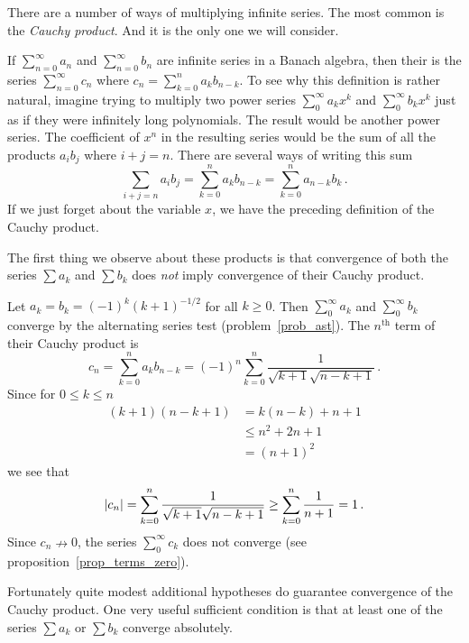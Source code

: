 There are a number of ways of multiplying infinite series.  The most common is the
\emph{Cauchy product}.  And it is the only one we will consider.

\begin{defn}  If $\sum_{n=0}^\infty a_n$ and $\sum_{n=0}^\infty b_n$ are infinite series in a
Banach algebra, then their
 is the series $\sum_{n=0}^\infty c_n$ where $c_n = \sum_{k=0}^n a_k
b_{n-k}$.  To see why this definition is rather natural, imagine trying to multiply two power
series $\sum_0^\infty a_kx^k$ and $\sum_0^\infty b_kx^k$ just as if they were infinitely long
polynomials.  The result would be another power series.  The coefficient of $x^n$ in the
resulting series would be the sum of all the products $a_ib_j$ where $i+j = n$. There are
several ways of writing this sum
  \[ \sum_{i+j = n}a_ib_j = \sum_{k=0}^n a_kb_{n-k} = \sum_{k=0}^n a_{n-k}b_k\,. \]
If we just forget about the variable $x$, we have the preceding definition of the Cauchy
product.
\end{defn}

The first thing we observe about these products is that convergence of both the series $\sum
a_k$ and $\sum b_k$ does \emph{not} imply convergence of their Cauchy product.

\begin{exam}  Let $a_k = b_k = (-1)^k(k+1)^{-1/2}$ for all $k \ge 0$.  Then $\sum_0^\infty a_k$
and $\sum_0^\infty b_k$ converge by the alternating series test (problem~\ref{prob_ast}).  The
$n^{\text{th}}$ term of their Cauchy product is
  \[ c_n = \sum_{k=0}^na_kb_{n-k} = (-1)^n\sum_{k=0}^n\frac1{\sqrt{k+1}\sqrt{n-k+1}}\,. \]
Since for $0 \le k \le n$
  \begin{align*}
      (k + 1)(n - k + 1) &= k(n - k) + n + 1 \\
                         &\le n^2 + 2n + 1 \\
                         &= (n + 1)^2
  \end{align*}
we see that
  \[ \lvert c_n\rvert = \sum_{k=0}^n\frac1{\sqrt{k + 1}\sqrt{n - k + 1}}
                                        \ge \sum_{k=0}^n\frac1{n + 1} = 1\,. \]
Since $c_n \nrightarrow 0$, the series $\sum_0^\infty c_k$ does not converge (see
proposition~\ref{prop_terms_zero}).
\end{exam}

Fortunately quite modest additional hypotheses do guarantee convergence of the Cauchy product.
One very useful sufficient condition is that at least one of the series $\sum a_k$ or $\sum
b_k$ converge absolutely.

